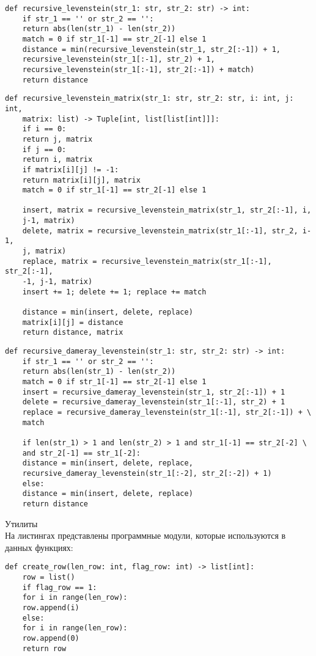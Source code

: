 \documentclass[12pt, a4paper]{article}
\begin{document}
\begin{lstlisting}[label=some-code,caption=Программный код нахождения расстояния Левенштейна рекурсивно без использования кэша]
	def recursive_levenstein(str_1: str, str_2: str) -> int:
	if str_1 == '' or str_2 == '':
	return abs(len(str_1) - len(str_2))
	match = 0 if str_1[-1] == str_2[-1] else 1
	distance = min(recursive_levenstein(str_1, str_2[:-1]) + 1,
	recursive_levenstein(str_1[:-1], str_2) + 1,
	recursive_levenstein(str_1[:-1], str_2[:-1]) + match)
	return distance
\end{lstlisting}

\begin{lstlisting}[label=some-code,caption=Программный код нахождения расстояния Левенштейна рекурсивно с использованием матрицы]
	def recursive_levenstein_matrix(str_1: str, str_2: str, i: int, j: int,
	matrix: list) -> Tuple[int, list[list[int]]]:
	if i == 0:
	return j, matrix
	if j == 0:
	return i, matrix
	if matrix[i][j] != -1:
	return matrix[i][j], matrix
	match = 0 if str_1[-1] == str_2[-1] else 1
	
	insert, matrix = recursive_levenstein_matrix(str_1, str_2[:-1], i,
	j-1, matrix)
	delete, matrix = recursive_levenstein_matrix(str_1[:-1], str_2, i-1,
	j, matrix)
	replace, matrix = recursive_levenstein_matrix(str_1[:-1], str_2[:-1],
	-1, j-1, matrix)
	insert += 1; delete += 1; replace += match
	
	distance = min(insert, delete, replace)
	matrix[i][j] = distance
	return distance, matrix
\end{lstlisting}

\begin{lstlisting}[label=some-code,caption=Программный код нахождения расстояния Дамерау-Левенштейна рекурсивно]
	def recursive_dameray_levenstein(str_1: str, str_2: str) -> int:
	if str_1 == '' or str_2 == '':
	return abs(len(str_1) - len(str_2))
	match = 0 if str_1[-1] == str_2[-1] else 1
	insert = recursive_dameray_levenstein(str_1, str_2[:-1]) + 1
	delete = recursive_dameray_levenstein(str_1[:-1], str_2) + 1
	replace = recursive_dameray_levenstein(str_1[:-1], str_2[:-1]) + \
	match
	
	if len(str_1) > 1 and len(str_2) > 1 and str_1[-1] == str_2[-2] \
	and str_2[-1] == str_1[-2]:
	distance = min(insert, delete, replace,
	recursive_dameray_levenstein(str_1[:-2], str_2[:-2]) + 1)
	else:
	distance = min(insert, delete, replace)
	return distance
\end{lstlisting}

\Large Утилиты \\
\normalsize На листингах представлены программные модули, которые используются в данных функциях:\\
\begin{lstlisting}[label=some-code,caption=Программный код создания для кэша в виде строки]
	def create_row(len_row: int, flag_row: int) -> list[int]:
	row = list()
	if flag_row == 1:
	for i in range(len_row):
	row.append(i)
	else:
	for i in range(len_row):
	row.append(0)
	return row
\end{lstlisting}
\end{document}
